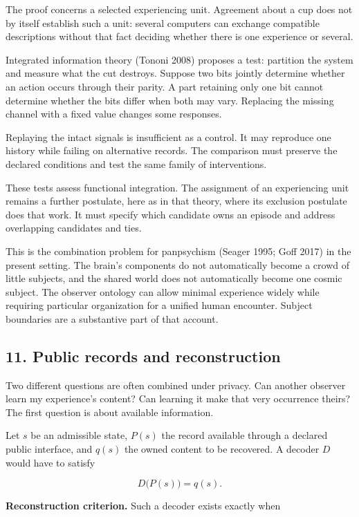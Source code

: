 \documentclass[
  11pt,
]{article}
\begin{document}
The proof concerns a selected experiencing unit. Agreement about a cup
does not by itself establish such a unit: several computers can exchange
compatible descriptions without that fact deciding whether there is one
experience or several.

Integrated information theory (Tononi 2008) proposes a test: partition
the system and measure what the cut destroys. Suppose two bits jointly
determine whether an action occurs through their parity. A part
retaining only one bit cannot determine whether the bits differ when
both may vary. Replacing the missing channel with a fixed value changes
some responses.

Replaying the intact signals is insufficient as a control. It may
reproduce one history while failing on alternative records. The
comparison must preserve the declared conditions and test the same
family of interventions.

These tests assess functional integration. The assignment of an
experiencing unit remains a further postulate, here as in that theory,
where its exclusion postulate does that work. It must specify which
candidate owns an episode and address overlapping candidates and ties.

This is the combination problem for panpsychism (Seager 1995; Goff 2017)
in the present setting. The brain's components do not automatically
become a crowd of little subjects, and the shared world does not
automatically become one cosmic subject. The observer ontology can allow
minimal experience widely while requiring particular organization for a
unified human encounter. Subject boundaries are a substantive part of
that account.

\subsection{11. Public records and
reconstruction}\label{public-records-and-reconstruction}

Two different questions are often combined under privacy. Can another
observer learn my experience's content? Can learning it make that very
occurrence theirs? The first question is about available information.

Let \(s\) be an admissible state, \(P(s)\) the record available through
a declared public interface, and \(q(s)\) the owned content to be
recovered. A decoder \(D\) would have to satisfy

\[
 D\bigl(P(s)\bigr)=q(s).
\]

\textbf{Reconstruction criterion.} Such a decoder exists exactly when
\end{document}
